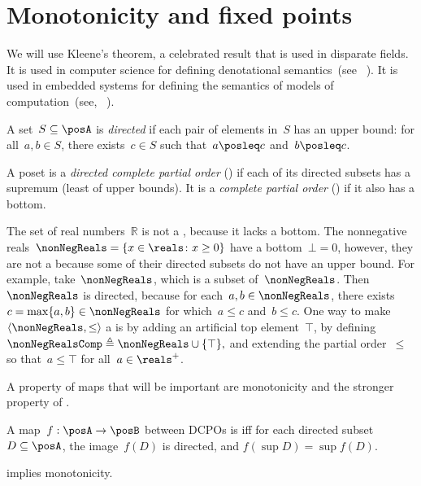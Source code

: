 \section{Monotonicity and fixed points}
\label{sec:Monotonicity-and-fixed}

We will use Kleene's theorem, a celebrated result that is used in
disparate fields. It is used in computer science for defining denotational
semantics~(see \eg~\cite{manes86}). It is used in embedded systems
for defining the semantics of models of computation~(see, \eg~\cite{lee10}).

\begin{definition}
    A set~$S\subseteq\posA$ is \emph{directed} if each pair of elements
    in~$S$ has an upper bound: for all~$a,b\in S$, there exists~$c\in S$
    such that~$a\posleq c$ and~$b\posleq c$.
\end{definition}

\begin{definition}[Completeness]
    \label{def:cpo}A poset is a \emph{directed complete partial order}
    (\DCPO) if each of its directed subsets has a supremum (least of
    upper bounds). It is a \emph{complete partial order} (\CPO) if it
    also has a bottom.

\end{definition}
\begin{example}
    \label{exa:Rcomp}The set of real numbers~$\mathbb{R}$ is not
    a \CPO, because it lacks a bottom. The nonnegative reals~$\nonNegReals=\{x\in\reals \colon x\geq0\}$
    have a bottom~$\bot=0$, however, they are not a \DCPO because some
    of their directed subsets do not have an upper bound. For example,
    take~$\nonNegReals$, which is a subset of~$\nonNegReals$. Then~$\nonNegReals$
    is directed, because for each~$a,b\in\nonNegReals$, there exists~$c=\max\{a,b\}\in\nonNegReals$
    for which~$a\leq c$ and~$b\leq c$. One way to make~$\left\langle \nonNegReals,\leq\right\rangle $
    a \CPO is by adding an artificial top element~$\top$, by defining~$\nonNegRealsComp\triangleq\nonNegReals\cup\{\top\},$
    and extending the partial order~$\leq$ so that~$a\leq\top$ for
    all~$a\in\reals^{+}$.
\end{example}

A property of maps that will be important are monotonicity and
the stronger property of \scottcontinuity.

\begin{definition}[\scottcontinuity]
    \label{def:scott}A map~$f:\posA\rightarrow\posB$ between DCPOs
    is\textbf{ }\emph{\scottcontinuous{}}\textbf{ }iff for each directed
    subset~$D\subseteq\posA$, the image~$f(D)$ is directed, and $f(\sup D)=\sup f(D).$
\end{definition}
\begin{remark}
    \scottcontinuity implies monotonicity.
\end{remark}

